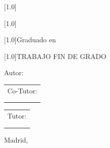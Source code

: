 \begin{titlepage}
\begin{center}
    \vspace*{0.1cm}

    \scalebox{.7}[1.0]{\huge{\MakeUppercase{\Universidad}}} \vspace*{1cm}

    \scalebox{.7}[1.0]{\huge{\MakeUppercase{\Centro}}} \vspace*{0.8cm}
    
    \scalebox{.7}[1.0]{\LARGE{Graduado en \Grado}} \vspace*{0.25cm}

    \scalebox{.7}[1.0]{\Huge{TRABAJO FIN DE GRADO}} \vspace*{2.0cm}

    \LARGE{\textbf{\textit{\TituloTFG}}} \vspace*{2.0cm}

    \LARGE{Autor: \NombreAutor}

  \end{center}

\endgroup

  \vspace*{2.0cm}

  \begin{minipage}{0.1\linewidth}
    \hspace*{-1.5cm}
    \noindent
    \begin{tabular}{l}
      Co-Tutor: \\
      \NombreCoTutor{} \\
      \DepartamentoCoTutor{}
    \end{tabular}
  \end{minipage}
  \begin{minipage}{0.4\linewidth}
    \begin{center}
      \qquad
    \end{center}
  \end{minipage}
  \begin{minipage}{0.1\linewidth}
    \noindent
    \begin{tabular}{l}
      Tutor: \\
      \NombreTutor{} \\
      \DepartamentoTutor{}
    \end{tabular}
  \end{minipage}

  \begin{flushright}
    \vspace*{\fill}
    Madrid, \FechaLectura
  \end{flushright}


\end{titlepage}
